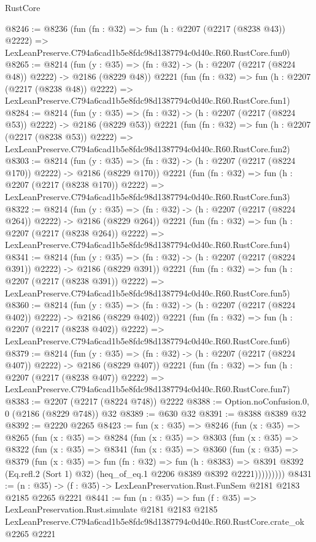 \begin{lexlean}{RustCore}
\begin{coremodule}
@8246 := @8236
    (fun (fn : @32) =>
    fun (h : @2207 (@2217 (@8238 @43)) @2222) =>
    LexLeanPreserve.C794a6cad1b5e8fdc98d1387794c0d40c.R60.RustCore.fun0)
@8265 := @8214
    (fun (y : @35) => (fn : @32) -> (h : @2207 (@2217 (@8224 @48)) @2222) -> @2186 (@8229 @48))
    @2221
    (fun (fn : @32) =>
    fun (h : @2207 (@2217 (@8238 @48)) @2222) =>
    LexLeanPreserve.C794a6cad1b5e8fdc98d1387794c0d40c.R60.RustCore.fun1)
@8284 := @8214
    (fun (y : @35) => (fn : @32) -> (h : @2207 (@2217 (@8224 @53)) @2222) -> @2186 (@8229 @53))
    @2221
    (fun (fn : @32) =>
    fun (h : @2207 (@2217 (@8238 @53)) @2222) =>
    LexLeanPreserve.C794a6cad1b5e8fdc98d1387794c0d40c.R60.RustCore.fun2)
@8303 := @8214
    (fun (y : @35) => (fn : @32) -> (h : @2207 (@2217 (@8224 @170)) @2222) -> @2186 (@8229 @170))
    @2221
    (fun (fn : @32) =>
    fun (h : @2207 (@2217 (@8238 @170)) @2222) =>
    LexLeanPreserve.C794a6cad1b5e8fdc98d1387794c0d40c.R60.RustCore.fun3)
@8322 := @8214
    (fun (y : @35) => (fn : @32) -> (h : @2207 (@2217 (@8224 @264)) @2222) -> @2186 (@8229 @264))
    @2221
    (fun (fn : @32) =>
    fun (h : @2207 (@2217 (@8238 @264)) @2222) =>
    LexLeanPreserve.C794a6cad1b5e8fdc98d1387794c0d40c.R60.RustCore.fun4)
@8341 := @8214
    (fun (y : @35) => (fn : @32) -> (h : @2207 (@2217 (@8224 @391)) @2222) -> @2186 (@8229 @391))
    @2221
    (fun (fn : @32) =>
    fun (h : @2207 (@2217 (@8238 @391)) @2222) =>
    LexLeanPreserve.C794a6cad1b5e8fdc98d1387794c0d40c.R60.RustCore.fun5)
@8360 := @8214
    (fun (y : @35) => (fn : @32) -> (h : @2207 (@2217 (@8224 @402)) @2222) -> @2186 (@8229 @402))
    @2221
    (fun (fn : @32) =>
    fun (h : @2207 (@2217 (@8238 @402)) @2222) =>
    LexLeanPreserve.C794a6cad1b5e8fdc98d1387794c0d40c.R60.RustCore.fun6)
@8379 := @8214
    (fun (y : @35) => (fn : @32) -> (h : @2207 (@2217 (@8224 @407)) @2222) -> @2186 (@8229 @407))
    @2221
    (fun (fn : @32) =>
    fun (h : @2207 (@2217 (@8238 @407)) @2222) =>
    LexLeanPreserve.C794a6cad1b5e8fdc98d1387794c0d40c.R60.RustCore.fun7)
@8383 := @2207 (@2217 (@8224 @748)) @2222
@8388 := Option.noConfusion.{0, 0} (@2186 (@8229 @748)) @32
@8389 := @630 @32
@8391 := @8388 @8389 @32
@8392 := @2220 @2265
@8423 := fun (x : @35) =>
  @8246
    (fun (x : @35) =>
    @8265
      (fun (x : @35) =>
      @8284
        (fun (x : @35) =>
        @8303
          (fun (x : @35) =>
          @8322
            (fun (x : @35) =>
            @8341
              (fun (x : @35) =>
              @8360
                (fun (x : @35) =>
                @8379
                  (fun (x : @35) =>
                  fun (fn : @32) =>
                  fun (h : @8383) =>
                  @8391
                    @8392
                    (Eq.refl.{2} (Sort 1) @32)
                    (heq_of_eq.{1} @2206 @8389 @8392 @2221)))))))))
@8431 := (n : @35) -> (f : @35) -> LexLeanPreservation.Rust.FunSem @2181 @2183 @2185 @2265 @2221
@8441 := fun (n : @35) =>
  fun (f : @35) =>
  LexLeanPreservation.Rust.simulate
    @2181
    @2183
    @2185
    LexLeanPreserve.C794a6cad1b5e8fdc98d1387794c0d40c.R60.RustCore.crate_ok
    @2265
    @2221
\end{coremodule}
\end{lexlean}
